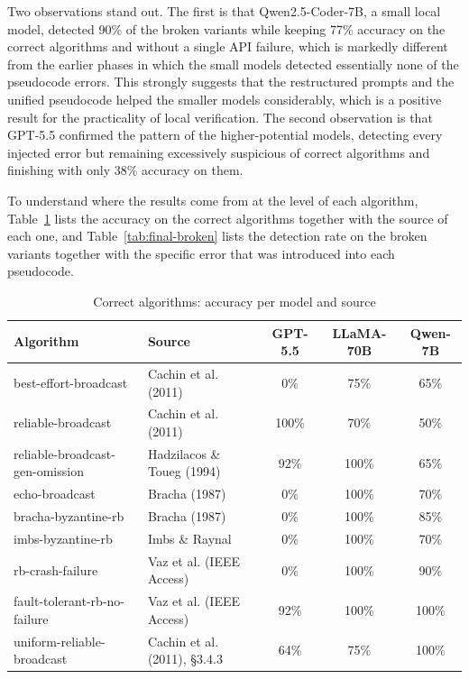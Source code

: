 Two observations stand out. The first is that Qwen2.5-Coder-7B, a small local model, detected 90\% of the broken variants while keeping 77\% accuracy on the correct algorithms and without a single API failure, which is markedly different from the earlier phases in which the small models detected essentially none of the pseudocode errors. This strongly suggests that the restructured prompts and the unified pseudocode helped the smaller models considerably, which is a positive result for the practicality of local verification. The second observation is that GPT-5.5 confirmed the pattern of the higher-potential models, detecting every injected error but remaining excessively suspicious of correct algorithms and finishing with only 38\% accuracy on them.

To understand where the results come from at the level of each algorithm, Table~\ref{tab:final-correct} lists the accuracy on the correct algorithms together with the source of each one, and Table~\ref{tab:final-broken} lists the detection rate on the broken variants together with the specific error that was introduced into each pseudocode.

\begin{table}[H]
\centering
\renewcommand{\arraystretch}{1.3}
\footnotesize
\caption{Correct algorithms: accuracy per model and source}
\label{tab:final-correct}
\begin{tabular}{|l|l|c|c|c|}
\hline
\textbf{Algorithm} & \textbf{Source} & \textbf{GPT-5.5} & \textbf{LLaMA-70B} & \textbf{Qwen-7B} \\
\hline
best-effort-broadcast & Cachin et al. (2011) & 0\% & 75\% & 65\% \\
reliable-broadcast & Cachin et al. (2011) & 100\% & 70\% & 50\% \\
reliable-broadcast-gen-omission & Hadzilacos \& Toueg (1994) & 92\% & 100\% & 65\% \\
echo-broadcast & Bracha (1987) & 0\% & 100\% & 70\% \\
bracha-byzantine-rb & Bracha (1987) & 0\% & 100\% & 85\% \\
imbs-byzantine-rb & Imbs \& Raynal & 0\% & 100\% & 70\% \\
rb-crash-failure & Vaz et al. (IEEE Access) & 0\% & 100\% & 90\% \\
fault-tolerant-rb-no-failure & Vaz et al. (IEEE Access) & 92\% & 100\% & 100\% \\
uniform-reliable-broadcast & Cachin et al. (2011), §3.4.3 & 64\% & 75\% & 100\% \\
\hline
\end{tabular}
\end{table}

